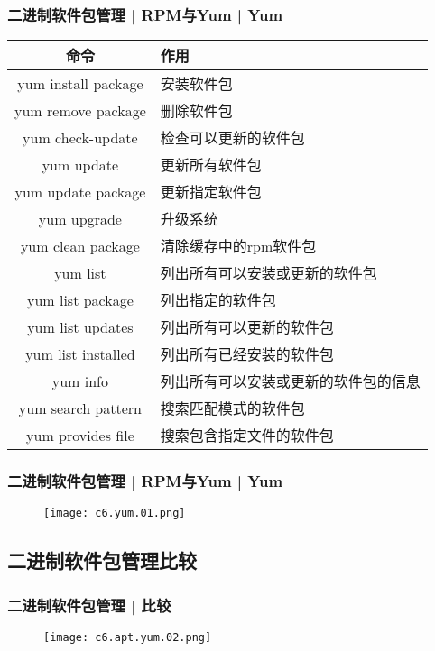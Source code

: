 \begin{frame}
  \frametitle{二进制软件包管理 | RPM与Yum | \alert{Yum}}
  \begin{table}
    \centering
    \begin{tabularx}{\textwidth}{cX}
      \hline
      \rowcolor{blue!50}命令 & 作用\\
      \hline
      yum install package & 安装软件包\\
      yum remove package & 删除软件包\\
      yum check-update & 检查可以更新的软件包\\
      yum update & 更新所有软件包\\
      yum update package & 更新指定软件包\\
      yum upgrade & 升级系统\\
      yum clean package & 清除缓存中的rpm软件包\\
      \hline
      yum list & 列出所有可以安装或更新的软件包\\
      yum list package & 列出指定的软件包\\
      yum list updates & 列出所有可以更新的软件包\\
      yum list installed & 列出所有已经安装的软件包\\
      yum info & 列出所有可以安装或更新的软件包的信息\\
      yum search pattern & 搜索匹配模式的软件包\\
      yum provides file & 搜索包含指定文件的软件包\\
      \hline
    \end{tabularx}
  \end{table}
\end{frame}

\begin{frame}
  \frametitle{二进制软件包管理 | RPM与Yum | Yum}
  \begin{figure}
    \centering
    \texttt{[image: c6.yum.01.png]}
  \end{figure}
\end{frame}

\subsection{二进制软件包管理比较}
\begin{frame}
  \frametitle{二进制软件包管理 | 比较}
  \begin{figure}
    \centering
    \texttt{[image: c6.apt.yum.02.png]}
  \end{figure}
\end{frame}

